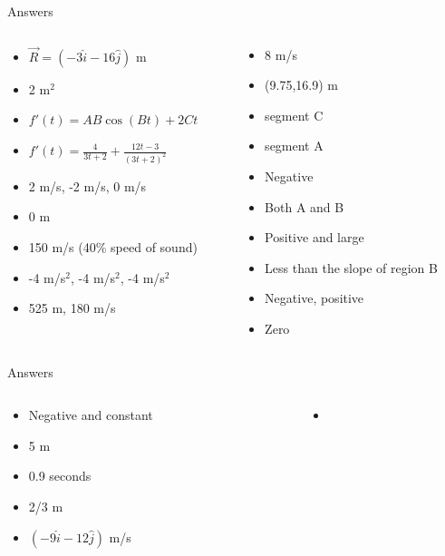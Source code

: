 \documentclass{beamer}
\begin{document}
\begin{frame}{Answers}
\begin{columns}[T]
\begin{column}{0.5\textwidth}
\begin{itemize}
\item $\vec{R} =  (-3\hat{i}-16\hat{j})$ m
\item 2 m$^2$
\item $f'(t) = AB\cos(Bt) + 2Ct$
\item $f'(t) = \frac{4}{3t+2}+\frac{12t-3}{(3t+2)^2}$
\item 2 m/s, -2 m/s, 0 m/s
\item 0 m
\item 150 m/s (40\% speed of sound)
\item -4 m/s$^2$, -4 m/s$^2$, -4 m/s$^2$
\item 525 m, 180 m/s
\end{itemize}
\end{column}
\begin{column}{0.5\textwidth}
\begin{itemize}
\item 8 m/s
\item (9.75,16.9) m
\item segment C
\item segment A
\item Negative
\item Both A and B
\item Positive and large
\item Less than the slope of region B
\item Negative, positive
\item Zero
\end{itemize}
\end{column}
\end{columns}
\end{frame}

\begin{frame}{Answers}
\begin{columns}[T]
\begin{column}{0.5\textwidth}
\begin{itemize}
\item Negative and constant
\item 5 m
\item 0.9 seconds
\item 2/3 m
\item $(-9\hat{i}-12\hat{j})$ m/s
\end{itemize}
\end{column}
\begin{column}{0.5\textwidth}
\begin{itemize}
\item 
\end{itemize}
\end{column}
\end{columns}
\end{frame}
\end{document}
